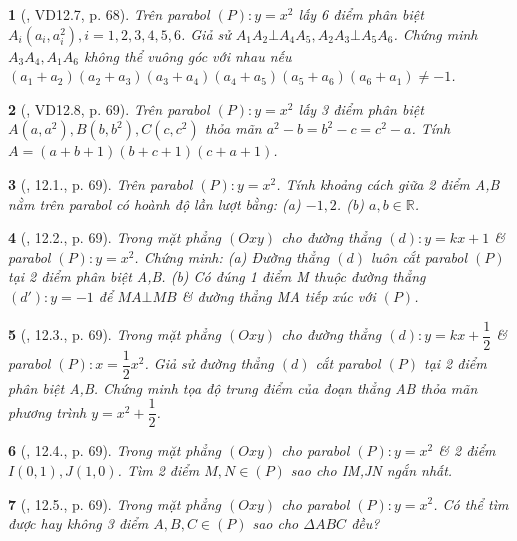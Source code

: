 \documentclass{article}
\newtheorem{baitoan}{}
\begin{document}
\begin{baitoan}[\cite{TLCT_THCS_Toan_9_dai_so}, VD12.7, p. 68]
	Trên parabol $(P):y = x^2$ lấy 6 điểm phân biệt $A_i(a_i,a_i^2),i = 1,2,3,4,5,6$. Giả sử $A_1A_2\bot A_4A_5,A_2A_3\bot A_5A_6$. Chứng minh $A_3A_4,A_1A_6$ không thể vuông góc với nhau nếu $(a_1 + a_2)(a_2 + a_3)(a_3 + a_4)(a_4 + a_5)(a_5 + a_6)(a_6 + a_1)\ne-1$.
\end{baitoan}

\begin{baitoan}[\cite{TLCT_THCS_Toan_9_dai_so}, VD12.8, p. 69]
	Trên parabol $(P):y = x^2$ lấy 3 điểm phân biệt $A(a,a^2),B(b,b^2),C(c,c^2)$ thỏa mãn $a^2 - b = b^2 - c = c^2 - a$. Tính $A =  (a + b + 1)(b + c + 1)(c + a + 1)$.
\end{baitoan}

\begin{baitoan}[\cite{TLCT_THCS_Toan_9_dai_so}, 12.1., p. 69]
	Trên parabol $(P):y = x^2$. Tính khoảng cách giữa 2 điểm A,B nằm trên parabol có hoành độ lần lượt bằng: (a) $-1,2$. (b) $a,b\in\mathbb{R}$.
\end{baitoan}

\begin{baitoan}[\cite{TLCT_THCS_Toan_9_dai_so}, 12.2., p. 69]
	Trong mặt phẳng $(Oxy)$ cho đường thẳng $(d):y = kx + 1$ \& parabol $(P):y = x^2$. Chứng minh: (a) Đường thẳng $(d)$ luôn cắt parabol $(P)$ tại 2 điểm phân biệt A,B. (b) Có đúng 1 điểm M thuộc đường thẳng $(d'):y = -1$ để $MA\bot MB$ \& đường thẳng MA tiếp xúc với $(P)$.
\end{baitoan}

\begin{baitoan}[\cite{TLCT_THCS_Toan_9_dai_so}, 12.3., p. 69]
	Trong mặt phẳng $(Oxy)$ cho đường thẳng $(d):y = kx + \dfrac{1}{2}$ \& parabol $(P):x = \dfrac{1}{2}x^2$. Giả sử đường thẳng $(d)$ cắt parabol $(P)$ tại 2 điểm phân biệt A,B. Chứng minh tọa độ trung điểm của đoạn thẳng AB thỏa mãn phương trình $y = x^2 + \dfrac{1}{2}$.
\end{baitoan}

\begin{baitoan}[\cite{TLCT_THCS_Toan_9_dai_so}, 12.4., p. 69]
	Trong mặt phẳng $(Oxy)$ cho parabol $(P): y = x^2$ \& 2 điểm $I(0,1),J(1,0)$. Tìm 2 điểm $M,N\in(P)$ sao cho IM,JN ngắn nhất.
\end{baitoan}

\begin{baitoan}[\cite{TLCT_THCS_Toan_9_dai_so}, 12.5., p. 69]
	Trong mặt phẳng $(Oxy)$ cho parabol $(P): y = x^2$. Có thể tìm được hay không 3 điểm $A,B,C\in(P)$ sao cho $\Delta ABC$ đều?
\end{baitoan}
\end{document}
